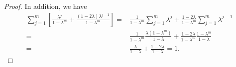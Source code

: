 \documentclass[12pt]{article}
\theoremstyle{definition}
\newcommand{\Fix}{\mathrm{Fix}\ }
\begin{document}
\begin{proof}
In addition, we have
\begin{equation}
\begin{array}{rl}
    \sum_{j=1}^m \left[\frac{\lambda^j}{1-\lambda^m}+\frac{(1-2\lambda)\lambda^{j-1}}{1-\lambda^m}\right]=&\frac{1}{1-\lambda^m}\sum_{j=1}^m \lambda^j+\frac{1-2\lambda}{1-\lambda^m}\sum_{j=1}^m \lambda^{j-1}\\[5pt]
    =&\frac{1}{1-\lambda^m}\frac{\lambda(1-\lambda^m)}{1-\lambda}+\frac{1-2\lambda}{1-\lambda^m}\frac{1-\lambda^m}{1-\lambda}\\[5pt]
    =&\frac{\lambda}{1-\lambda}+\frac{1-2\lambda}{1-\lambda}=1.
\end{array}
\end{equation}


\end{proof}
\end{document}
